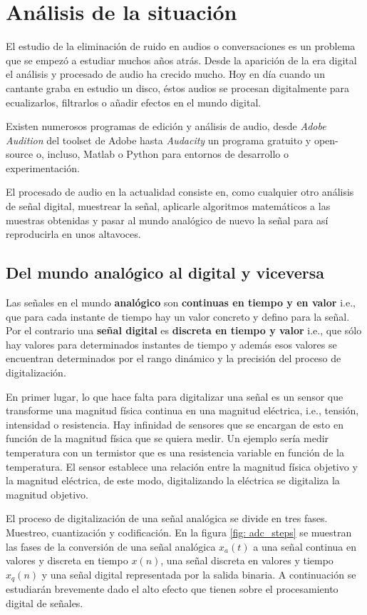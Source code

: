 \chapter{Análisis de la situación}\label{cp: situationalAnalysis}
El estudio de la eliminación de ruido en audios o conversaciones es un problema que se empezó a estudiar muchos años atrás. Desde la aparición de la era digital el análisis y procesado de audio ha crecido mucho. Hoy en día cuando un cantante graba en estudio un disco, éstos audios se procesan digitalmente para ecualizarlos, filtrarlos o añadir efectos en el mundo digital.

Existen numerosos programas de edición y análisis de audio, desde \textit{Adobe Audition} del toolset de Adobe hasta \textit{Audacity} un programa gratuito y open-source o, incluso, Matlab\superscript{\textregistered} o Python para entornos de desarrollo o experimentación.

El procesado de audio en la actualidad consiste en, como cualquier otro análisis de señal digital, muestrear la señal, aplicarle algoritmos matemáticos a las muestras obtenidas y pasar al mundo analógico de nuevo la señal para así reproducirla en unos altavoces.

\section{Del mundo analógico al digital y viceversa}
Las señales en el mundo \textbf{analógico} son \textbf{continuas en tiempo y en valor} i.e., que para cada instante de tiempo hay un valor concreto y defino para la señal. Por el contrario una \textbf{señal digital} es \textbf{discreta en tiempo y valor} i.e., que sólo hay valores para determinados instantes de tiempo y además esos valores se encuentran determinados por el rango dinámico y la precisión del proceso de digitalización.

En primer lugar, lo que hace falta para digitalizar una señal es un sensor que transforme una magnitud física continua en una magnitud eléctrica, i.e., tensión, intensidad o resistencia. Hay infinidad de sensores que se encargan de esto en función de la magnitud física que se quiera medir. Un ejemplo sería medir temperatura con un termistor que es una resistencia variable en función de la temperatura. El sensor establece una relación entre la magnitud física objetivo y la magnitud eléctrica, de este modo, digitalizando la eléctrica se digitaliza la magnitud objetivo.

El proceso de digitalización de una señal analógica se divide en tres fases. Muestreo, cuantización y codificación. En la figura \ref{fig: adc_steps} se muestran las fases de la conversión de una señal analógica $x_a(t)$ a una señal continua en valores y discreta en tiempo $x(n)$, una señal discreta en valores y tiempo $x_q(n)$ y una señal digital representada por la salida binaria. A continuación se estudiarán brevemente dado el alto efecto que tienen sobre el procesamiento digital de señales.

